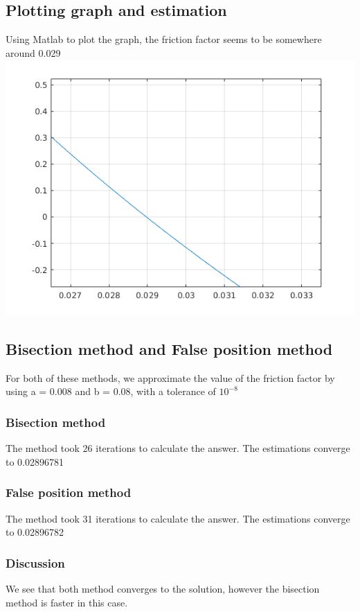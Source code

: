 \documentclass[openany]{book}
\begin{document}
    \subsection{Plotting graph and estimation}
    Using Matlab to plot the graph, the friction factor seems to be somewhere around 0.029 \\
    \includegraphics[scale=0.6]{untitled.png}
    
    \subsection{Bisection method and False position method}
    For both of these methods, we approximate the value of the friction factor by using a = 0.008 and b = 0.08, with a tolerance of ${10^{-8}}$
    \subsubsection{Bisection method}
    The method took 26 iterations to calculate the answer. The estimations converge to 0.02896781 
    \subsubsection{False position method}
    The method took 31 iterations to calculate the answer. The estimations converge to 0.02896782
    \subsubsection{Discussion}
    We see that both method converges to the solution, however the bisection method is faster in this case.
\end{document}
